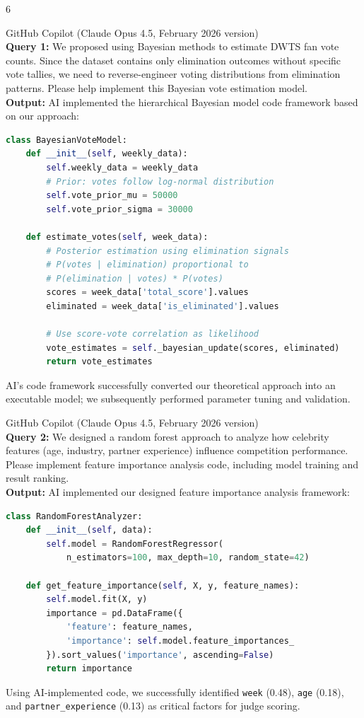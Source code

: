 \AImatter

\begin{ReportAiUse}{6}

GitHub Copilot (Claude Opus 4.5, February 2026 version)\\
\textbf{Query 1:} We proposed using Bayesian methods to estimate DWTS fan vote counts. Since the dataset contains only elimination outcomes without specific vote tallies, we need to reverse-engineer voting distributions from elimination patterns. Please help implement this Bayesian vote estimation model.\\
\textbf{Output:} AI implemented the hierarchical Bayesian model code framework based on our approach:
\begin{lstlisting}[language=python]
class BayesianVoteModel:
    def __init__(self, weekly_data):
        self.weekly_data = weekly_data
        # Prior: votes follow log-normal distribution
        self.vote_prior_mu = 50000
        self.vote_prior_sigma = 30000
        
    def estimate_votes(self, week_data):
        # Posterior estimation using elimination signals
        # P(votes | elimination) proportional to 
        # P(elimination | votes) * P(votes)
        scores = week_data['total_score'].values
        eliminated = week_data['is_eliminated'].values
        
        # Use score-vote correlation as likelihood
        vote_estimates = self._bayesian_update(scores, eliminated)
        return vote_estimates
\end{lstlisting}
AI's code framework successfully converted our theoretical approach into an executable model; we subsequently performed parameter tuning and validation.

GitHub Copilot (Claude Opus 4.5, February 2026 version)\\
\textbf{Query 2:} We designed a random forest approach to analyze how celebrity features (age, industry, partner experience) influence competition performance. Please implement feature importance analysis code, including model training and result ranking.\\
\textbf{Output:} AI implemented our designed feature importance analysis framework:
\begin{lstlisting}[language=python]
class RandomForestAnalyzer:
    def __init__(self, data):
        self.model = RandomForestRegressor(
            n_estimators=100, max_depth=10, random_state=42)
        
    def get_feature_importance(self, X, y, feature_names):
        self.model.fit(X, y)
        importance = pd.DataFrame({
            'feature': feature_names,
            'importance': self.model.feature_importances_
        }).sort_values('importance', ascending=False)
        return importance
\end{lstlisting}
Using AI-implemented code, we successfully identified \texttt{week} (0.48), \texttt{age} (0.18), and \texttt{partner\_experience} (0.13) as critical factors for judge scoring.


\end{ReportAiUse}
